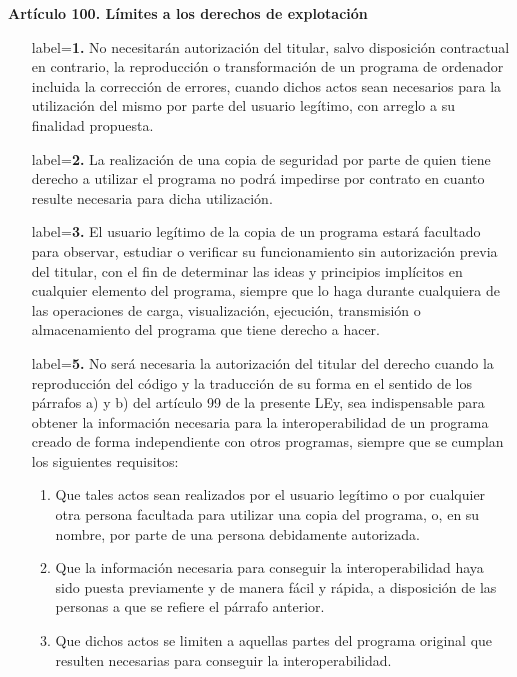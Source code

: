 \textbf{Artículo 100. Límites a los derechos de explotación}
\begin{itemize}
    \item[label=\textbf{1.}] No necesitarán autorización del titular, salvo disposición contractual en contrario, la reproducción o transformación de un programa de ordenador incluida la corrección de errores, cuando dichos actos sean necesarios para la utilización del mismo por parte del usuario legítimo, con arreglo a su finalidad propuesta.
    \item[label=\textbf{2.}] La realización de una copia de seguridad por parte de quien tiene derecho a utilizar el programa no podrá impedirse por contrato en cuanto resulte necesaria para dicha utilización.
    \item[label=\textbf{3.}] El usuario legítimo de la copia de un programa estará facultado para observar, estudiar o verificar su funcionamiento sin autorización previa del titular, con el fin de determinar las ideas y principios implícitos en cualquier elemento del programa, siempre que lo haga durante cualquiera de las operaciones de carga, visualización, ejecución, transmisión o almacenamiento del programa que tiene derecho a hacer.
    \item[label=\textbf{5.}] No será necesaria la autorización del titular del derecho cuando la reproducción del código y la traducción de su forma en el sentido de los párrafos a) y b)  del artículo 99 de la presente LEy, sea indispensable para obtener la información necesaria para la interoperabilidad de un programa creado de forma independiente con otros programas, siempre que se cumplan los siguientes requisitos:
        \begin{enumerate}[label=\textbf{\alph*)}]
            \item Que tales actos sean realizados por el usuario legítimo o por cualquier otra persona facultada para utilizar una copia del programa, o, en su nombre, por parte de una persona debidamente autorizada.
            \item Que la información necesaria para conseguir la interoperabilidad haya sido puesta previamente y de manera fácil y rápida, a disposición de las personas a que se refiere el párrafo anterior.
            \item Que dichos actos se limiten a aquellas partes del programa original que resulten necesarias para conseguir la interoperabilidad.
        \end{enumerate}
\end{itemize}

